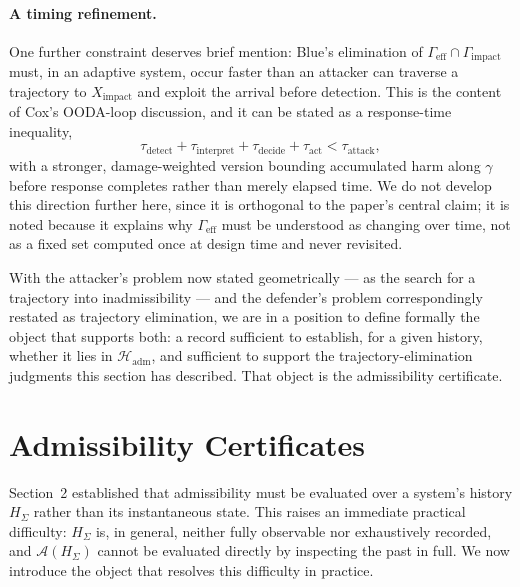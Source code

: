 \documentclass[11pt]{article}
\begin{document}
\paragraph{A timing refinement.} One further constraint deserves brief mention: Blue's elimination of $\Gamma_{\mathrm{eff}} \cap \Gamma_{\mathrm{impact}}$ must, in an adaptive system, occur faster than an attacker can traverse a trajectory to $X_{\mathrm{impact}}$ and exploit the arrival before detection. This is the content of Cox's OODA-loop discussion, and it can be stated as a response-time inequality,
\begin{equation}
\tau_{\mathrm{detect}} + \tau_{\mathrm{interpret}} + \tau_{\mathrm{decide}} + \tau_{\mathrm{act}} < \tau_{\mathrm{attack}},
\end{equation}
with a stronger, damage-weighted version bounding accumulated harm along $\gamma$ before response completes rather than merely elapsed time. We do not develop this direction further here, since it is orthogonal to the paper's central claim; it is noted because it explains why $\Gamma_{\mathrm{eff}}$ must be understood as changing over time, not as a fixed set computed once at design time and never revisited.

With the attacker's problem now stated geometrically --- as the search for a trajectory into inadmissibility --- and the defender's problem correspondingly restated as trajectory elimination, we are in a position to define formally the object that supports both: a record sufficient to establish, for a given history, whether it lies in $\mathcal{H}_{\mathrm{adm}}$, and sufficient to support the trajectory-elimination judgments this section has described. That object is the admissibility certificate.

\section{Admissibility Certificates}

Section~2 established that admissibility must be evaluated over a system's history $H_\Sigma$ rather than its instantaneous state. This raises an immediate practical difficulty: $H_\Sigma$ is, in general, neither fully observable nor exhaustively recorded, and $\mathcal{A}(H_\Sigma)$ cannot be evaluated directly by inspecting the past in full. We now introduce the object that resolves this difficulty in practice.
\end{document}
